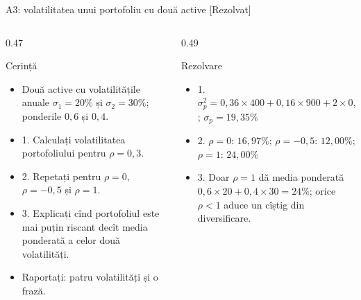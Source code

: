 \begin{frame}{A3: volatilitatea unui portofoliu cu două active [Rezolvat]}
\itemsize{\footnotesize}
\begin{columns}[T]
\begin{column}{0.47\textwidth}
\begin{block}{Cerință}
\begin{itemize}
    \item Două active cu volatilitățile anuale $\sigma_1 = 20\%$ și $\sigma_2 = 30\%$; ponderile $0{,}6$ și $0{,}4$.
    \item 1. Calculați volatilitatea portofoliului pentru $\rho = 0{,}3$.
    \item 2. Repetați pentru $\rho = 0$, $\rho = -0{,}5$ și $\rho = 1$.
    \item 3. Explicați cînd portofoliul este mai puțin riscant decît media ponderată a celor două volatilități.
    \item Raportați: patru volatilități și o frază.
\end{itemize}
\end{block}
\end{column}
\begin{column}{0.49\textwidth}
\begin{exampleblock}{Rezolvare}
\begin{itemize}
    \item 1. $\sigma_p^2 = 0{,}36 \times 400 + 0{,}16 \times 900 + 2 \times 0{,}24 \times 0{,}3 \times 600 = 374{,}4$; $\sigma_p = 19{,}35\%$
    \item 2. $\rho = 0$: $16{,}97\%$; $\rho = -0{,}5$: $12{,}00\%$; $\rho = 1$: $24{,}00\%$
    \item 3. Doar $\rho = 1$ dă media ponderată $0{,}6 \times 20 + 0{,}4 \times 30 = 24\%$; orice $\rho < 1$ aduce un cîștig din diversificare.
\end{itemize}
\end{exampleblock}
\end{column}
\end{columns}
\end{frame}

